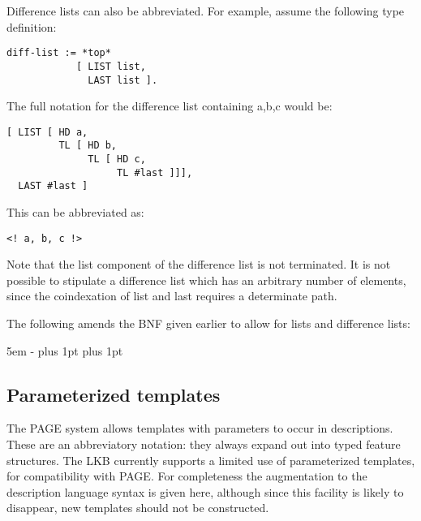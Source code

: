 \documentclass[12pt]{report}
\begin{document}
Difference lists can also be abbreviated.  For example,
assume the following type definition:
\begin{verbatim}
diff-list := *top*
            [ LIST list,
              LAST list ].
\end{verbatim}
The full notation for the difference list containing a,b,c would be:
\begin{verbatim}
[ LIST [ HD a,
         TL [ HD b,
              TL [ HD c,
                   TL #last ]]],
  LAST #last ]
\end{verbatim}
This can be abbreviated as:
\begin{verbatim}
<! a, b, c !>
\end{verbatim}
Note that the list component of the difference list is not terminated.
It is not possible to stipulate a difference list which has an arbitrary
number of elements, since the coindexation of {\feature list}
and {\feature last} requires a determinate
path.

The following amends the BNF given earlier to allow for lists and difference
lists:
\begin{list}{}
   {\leftmargin 5em
    \itemindent -\leftmargin
    \itemsep 0pt plus 1pt
    \parsep 0pt plus 1pt}
%
%
%
\end{list}

\subsection{Parameterized templates}
\label{templatedesc}

The PAGE system allows templates with parameters to occur in descriptions.
These are an abbreviatory notation: they always expand out into 
typed feature structures.
The LKB currently supports a limited use of parameterized
templates, for compatibility with PAGE.
For completeness the augmentation to the description language
syntax is given here, although since this facility is likely
to disappear, new templates should not be constructed.
\end{document}
